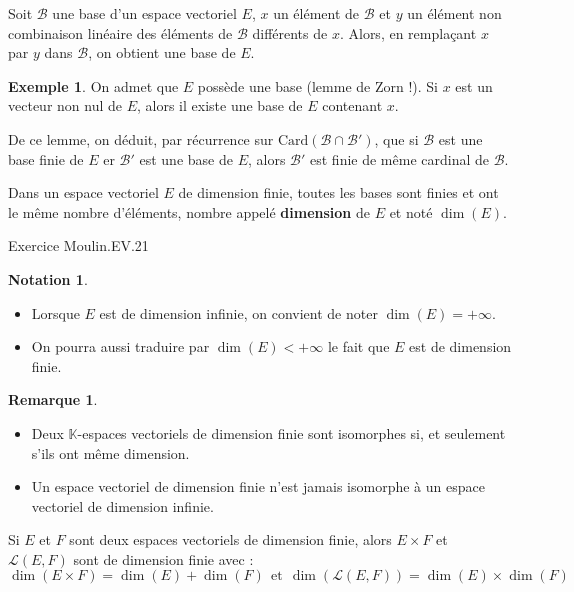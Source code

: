 \documentclass[french]{article}
\newcommand{\K}{\mathbb{K}}
\newcommand{\card}{\text{Card}}
\theoremstyle{plain}
\theoremstyle{definition}
\newtheorem*{ex}{Exemple}
\newtheorem*{rmq}{Remarque}
\newtheorem*{notation}{Notation}
\theoremstyle{remark}
\begin{document}
\begin{lem}%
	Soit $\mathcal{B}$ une base d'un espace vectoriel $E$, $x$ un élément de $\mathcal{B}$ et $y$ un élément non combinaison linéaire des éléments de $\mathcal{B}$ différents de $x$. Alors, en remplaçant $x$ par $y$ dans $\mathcal{B}$, on obtient une base de $E$.
\end{lem}

\begin{ex}
	On admet que $E$ possède une base (lemme de Zorn !). Si $x$ est un vecteur non nul de $E$, alors il existe une base de $E$ contenant $x$.
\end{ex}

De ce lemme, on déduit, par récurrence sur $\card(\mathcal{B}\cap\mathcal{B}')$, que si $\mathcal{B}$ est une base finie de $E$ er $\mathcal{B}'$ est une base de $E$, alors $\mathcal{B}'$ est finie de même cardinal de $\mathcal{B}$.

\begin{dfn}
	Dans un espace vectoriel $E$ de dimension finie, toutes les bases sont finies et ont le même nombre d'éléments, nombre appelé \textbf{dimension} de $E$ et noté $\dim(E)$.
\end{dfn}

Exercice Moulin.EV.21


\begin{notation}
	\begin{itemize}
	\item Lorsque $E$ est de dimension infinie, on convient de noter $\dim(E)=+\infty$.
	\item On pourra aussi traduire par $\dim(E)<+\infty$ le fait que $E$ est de dimension finie.
\end{itemize}
\end{notation}

\begin{rmq}
	\begin{itemize}
		\item Deux $\K$-espaces vectoriels de dimension finie sont isomorphes si, et seulement s'ils ont même dimension.
		\item Un espace vectoriel de dimension finie n'est jamais isomorphe à un espace vectoriel de dimension infinie.
	\end{itemize}
\end{rmq}

\begin{prop}%
	Si $E$ et $F$ sont deux espaces vectoriels de dimension finie, alors $E\times F$ et $\mathcal{L}(E,F)$ sont de dimension finie avec : $$\dim(E\times F)=\dim(E)+\dim(F)\ \ \text{et}\ \ \dim\left(\mathcal{L}(E,F)\right)=\dim(E)\times\dim(F)$$
\end{prop}
\end{document}

